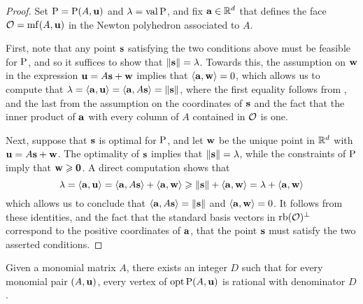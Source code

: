 \documentclass[11pt]{amsart}
\begin{document}
\begin{proof}  
Set $\mathrm{P} = \mathrm{P}(A, \mathbf{u})$ and $\lambda = \operatorname{val} \mathrm{P}$, and fix $\mathbf{a} \in \mathbb{R}^d$ that defines the face $\mathcal{O} = \operatorname{mf}(A, \mathbf{u})$ in the Newton polyhedron associated to $A$. 

First, note that any point $\mathbf{s}$ satisfying the two conditions above must be feasible for $\mathrm{P}$, and so it suffices to show that $\| \mathbf{s} \| = \lambda$.
Towards this, the assumption on $\mathbf{w}$ in the expression $\mathbf{u} = A \mathbf{s} + \mathbf{w}$ implies that $\langle \mathbf{a}, \mathbf{w} \rangle = 0$, which allows us to compute that $\lambda = \langle \mathbf{a}, \mathbf{u} \rangle = \langle \mathbf{a}, A\mathbf{s} \rangle = \| \mathbf{s} \|$, where the first equality follows from 
, and the last from the assumption on the coordinates of $\mathbf{s}$ and the fact that the inner product of $\mathbf{a}$ with every column of $A$ contained in $\mathcal{O}$ is one.

Next, suppose that $\mathbf{s}$ is optimal for $\mathrm{P}$, and let $\mathbf{w}$ be the unique point in $\mathbb{R}^d$ with $\mathbf{u} = A \mathbf{s} + \mathbf{w}$.  The optimality of $\mathbf{s}$ implies that $\| \mathbf{s} \| = \lambda$, while the constraints of $\mathrm{P}$ imply that $\mathbf{w} \geqslant \mathbf{0}$.  A direct computation shows that
%
\[ \lambda = \langle \mathbf{a}, \mathbf{u} \rangle = \langle \mathbf{a}, A \mathbf{s} \rangle + \langle \mathbf{a}, \mathbf{w} \rangle \geqslant \| \mathbf{s} \| + \langle \mathbf{a}, \mathbf{w} \rangle = \lambda + \langle \mathbf{a}, \mathbf{w} \rangle \]
%
which allows us to conclude that $\langle \mathbf{a}, A \mathbf{s} \rangle = \| \mathbf{s} \|$ and $\langle \mathbf{a}, \mathbf{w} \rangle = 0$.
It follows from these identities, and the fact that the standard basis vectors in $\operatorname{rb}(\mathcal{O})^{\perp}$ correspond to the positive coordinates of $\mathbf{a}$, that the point $\mathbf{s}$ must satisfy the two asserted conditions.
\end{proof}



\begin{theorem}  
\label{uniform denominators for vertices:  T}
Given a monomial matrix $A$, there exists an integer $D$ such that for every monomial pair $(A, \mathbf{u})$, every vertex of $\operatorname{opt} \mathrm{P}(A, \mathbf{u})$ is rational with denominator $D$.
\end{theorem}
\end{document}
